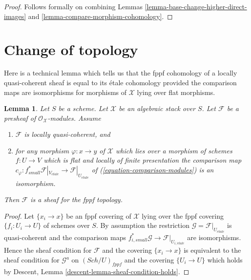 \documentclass{stacks-project}
\theoremstyle{plain}
\newtheorem{lemma}[subsection]{Lemma}
\theoremstyle{definition}
\theoremstyle{remark}
\numberwithin{equation}{subsection}
\def\Sch{\mathit{Sch}}
\def\etale{{\acute{e}tale}}
\begin{document}
\begin{proof}
Follows formally on combining
Lemmas \ref{lemma-base-change-higher-direct-images} and
\ref{lemma-compare-morphism-cohomology}.
\end{proof}











\section{Change of topology}
\label{section-change-topology}

\noindent
Here is a technical lemma which tells us that the
fppf cohomology of a locally quasi-coherent sheaf is equal to its
\'etale cohomology provided the comparison maps are isomorphisms
for morphisms of $\mathcal{X}$ lying over flat morphisms.

\begin{lemma}
\label{lemma-lqc-flat-base-change-fppf-sheaf}
Let $S$ be a scheme. Let $\mathcal{X}$ be an algebraic stack over $S$.
Let $\mathcal{F}$ be a presheaf of $\mathcal{O}_\mathcal{X}$-modules.
Assume
\begin{enumerate}
\item[(a)] $\mathcal{F}$ is locally quasi-coherent, and
\item[(b)] for any morphism $\varphi : x \to y$ of $\mathcal{X}$ which lies
over a morphism of schemes $f : U \to V$ which is flat and
locally of finite presentation the comparison map
$c_\varphi : f_{small}^*\mathcal{F}|_{V_\etale} \to
\mathcal{F}|_{U_\etale}$ of
(\ref{equation-comparison-modules}) is an isomorphism.
\end{enumerate}
Then $\mathcal{F}$ is a sheaf for the fppf topology.
\end{lemma}

\begin{proof}
Let $\{x_i \to x\}$ be an fppf covering of $\mathcal{X}$ lying over the
fppf covering $\{f_i : U_i \to U\}$ of schemes over $S$.
By assumption the restriction $\mathcal{G} = \mathcal{F}|_{U_\etale}$
is quasi-coherent and the comparison maps
$f_{i, small}^*\mathcal{G} \to \mathcal{F}|_{U_{i, \etale}}$
are isomorphisms. Hence the sheaf condition for $\mathcal{F}$
and the covering $\{x_i \to x\}$ is equivalent to the sheaf condition
for $\mathcal{G}^a$ on $(\Sch/U)_{fppf}$ and the covering $\{U_i \to U\}$
which holds by
Descent, Lemma \ref{descent-lemma-sheaf-condition-holds}.
\end{proof}
\end{document}
